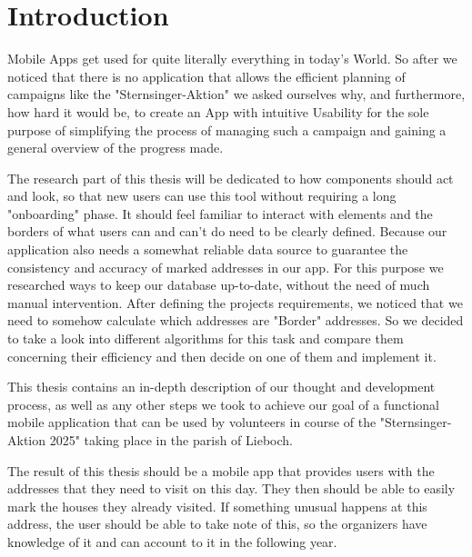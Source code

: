 \section{Introduction}


Mobile Apps get used for quite literally everything in today's World. So after
we noticed that there is no application that allows the efficient planning of
campaigns like the "Sternsinger-Aktion" we asked ourselves why, and furthermore,
how hard it would be, to create an App with intuitive Usability for the sole
purpose of simplifying the process of managing such a campaign and gaining a
general overview of the progress made. \newline

The research part of this thesis will be dedicated to how components should act
and look, so that new users can use this tool without requiring a long "onboarding" phase. It should feel familiar to interact with elements and the
borders of what users can and can't do need to be clearly defined. Because our
application also needs a somewhat reliable data source to guarantee the
consistency and accuracy of marked addresses in our app. For this purpose we
researched ways to keep our database up-to-date, without the need of much manual
intervention. After defining the projects requirements, we noticed that we need
to somehow calculate which addresses are "Border" addresses. So we decided to take a look into different algorithms for this task and compare them concerning their efficiency and then decide on one of them and implement it.
\newline


This thesis contains an in-depth description of our thought and development
process, as well as any other steps we took to achieve our goal of a
functional mobile application that can be used by volunteers in course of the
"Sternsinger-Aktion 2025" taking place in the parish of Lieboch. \newline

The result of this thesis should be a mobile app that provides users with the addresses that they need to visit on this day. They then should be able to easily mark the houses they already visited. If something unusual happens at this address, the user should be able to take note of this, so the organizers have knowledge of it and can account to it in the following year.

